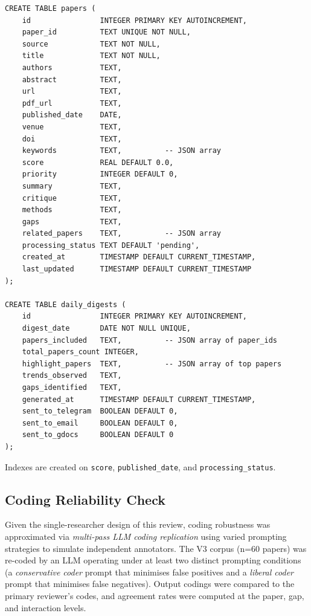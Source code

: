 \begin{verbatim}
CREATE TABLE papers (
    id                INTEGER PRIMARY KEY AUTOINCREMENT,
    paper_id          TEXT UNIQUE NOT NULL,
    source            TEXT NOT NULL,
    title             TEXT NOT NULL,
    authors           TEXT,
    abstract          TEXT,
    url               TEXT,
    pdf_url           TEXT,
    published_date    DATE,
    venue             TEXT,
    doi               TEXT,
    keywords          TEXT,          -- JSON array
    score             REAL DEFAULT 0.0,
    priority          INTEGER DEFAULT 0,
    summary           TEXT,
    critique          TEXT,
    methods           TEXT,
    gaps              TEXT,
    related_papers    TEXT,          -- JSON array
    processing_status TEXT DEFAULT 'pending',
    created_at        TIMESTAMP DEFAULT CURRENT_TIMESTAMP,
    last_updated      TIMESTAMP DEFAULT CURRENT_TIMESTAMP
);

CREATE TABLE daily_digests (
    id                INTEGER PRIMARY KEY AUTOINCREMENT,
    digest_date       DATE NOT NULL UNIQUE,
    papers_included   TEXT,          -- JSON array of paper_ids
    total_papers_count INTEGER,
    highlight_papers  TEXT,          -- JSON array of top papers
    trends_observed   TEXT,
    gaps_identified   TEXT,
    generated_at      TIMESTAMP DEFAULT CURRENT_TIMESTAMP,
    sent_to_telegram  BOOLEAN DEFAULT 0,
    sent_to_email     BOOLEAN DEFAULT 0,
    sent_to_gdocs     BOOLEAN DEFAULT 0
);
\end{verbatim}

Indexes are created on \texttt{score}, \texttt{published\_date}, and
\texttt{processing\_status}.


\subsection{Coding Reliability Check}
\label{sec:app_coding_reliability}

Given the single-researcher design of this review, coding robustness
was approximated via \textit{multi-pass LLM coding replication} using
varied prompting strategies to simulate independent annotators. The
V3 corpus (n=60 papers) was re-coded by an LLM operating under at
least two distinct prompting conditions (a \emph{conservative coder}
prompt that minimises false positives and a \emph{liberal coder}
prompt that minimises false negatives). Output codings were compared
to the primary reviewer's codes, and agreement rates were computed
at the paper, gap, and interaction levels.

